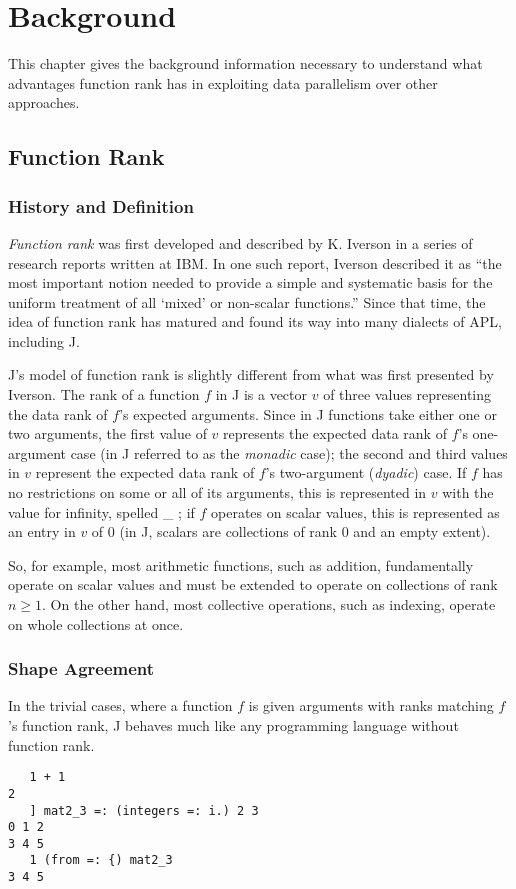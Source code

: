 \chapter{Background}
\label{back}

This chapter gives the background information necessary to understand what advantages function rank has in exploiting data parallelism over other approaches.

\section{Function Rank}
\subsection{History and Definition}
\textit{Function rank} was first developed and described by K. Iverson in a series of research reports written at IBM. %
In one such report, Iverson described it as 
``the most important notion needed to provide a simple and systematic basis for the uniform treatment of all `mixed' or non-scalar functions.''\cite{rapl} %
Since that time, the idea of function rank has matured and found its way into many dialects of APL, including J.

J's model of function rank is slightly different from what was first presented by Iverson. \cite{rankanduni} \cite{jvocab}
The rank of a function $f$ in J is a vector $v$ of three values representing the data rank of $f$'s expected arguments.
Since in J functions take either one or two arguments, the first value of $v$ represents the expected data rank of $f$'s one-argument case (in J referred to as the \textit{monadic} case);
the second and third values in $v$ represent the expected data rank of $f$'s two-argument (\textit{dyadic}) case.
If $f$ has no restrictions on some or all of its arguments, this is represented in $v$ with the value for infinity, spelled \ttfamily \_ \normalfont ;
if $f$ operates on scalar values, this is represented as an entry in $v$ of 0 (in J, scalars are collections of rank 0 and an empty extent). %

So, for example, most arithmetic functions, such as addition, fundamentally operate on scalar values and must be extended to operate on collections of rank $n \ge 1$.
On the other hand, most collective operations, such as indexing, operate on whole collections at once.

\subsection{Shape Agreement}
In the trivial cases, where a function $f$ is given arguments with ranks matching $f$'s function rank, 
J behaves much like any programming language without function rank. %
\begin{verbatim}
   1 + 1
2
   ] mat2_3 =: (integers =: i.) 2 3
0 1 2
3 4 5
   1 (from =: {) mat2_3
3 4 5
\end{verbatim}

